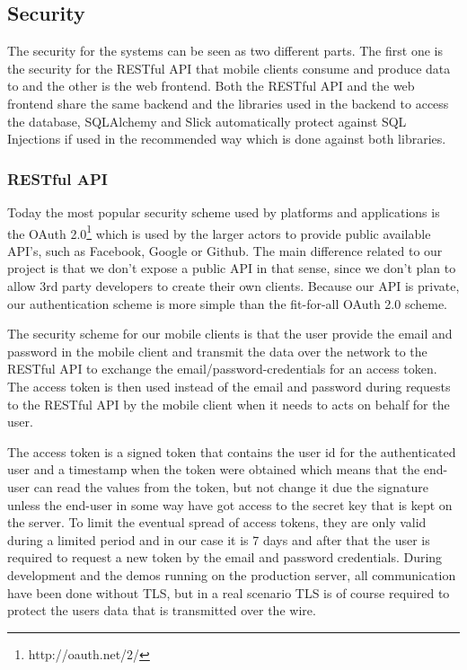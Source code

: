\subsection{Security}
The security for the systems can be seen as two different parts. The first one is the security for the RESTful API that mobile clients consume and produce data to and the other is the web frontend. Both the RESTful API and the web frontend share the same backend and the libraries used in the backend to access the database, SQLAlchemy and Slick automatically protect against SQL Injections if used in the recommended way which is done against both libraries.

\subsubsection{RESTful API}
Today the most popular security scheme used by platforms and applications is the OAuth 2.0\footnote{http://oauth.net/2/} which is used by the larger actors to provide public available API's, such as Facebook, Google or Github. The main difference related to our project is that we don't expose a public API in that sense, since we don't plan to allow 3rd party developers to create their own clients. Because our API is private, our authentication scheme is more simple than the fit-for-all OAuth 2.0 scheme. 

The security scheme for our mobile clients is that the user provide the email and password in the mobile client and transmit the data over the network to the RESTful API to exchange the email/password-credentials for an access token. The access token is then used instead of the email and password during requests to the RESTful API by the mobile client when it needs to acts on behalf for the user. 

The access token is a signed token that contains the user id for the authenticated user and a timestamp when the token were obtained which means that the end-user can read the values from the token, but not change it due the signature unless the end-user in some way have got access to the secret key that is kept on the server. To limit the eventual spread of access tokens, they are only valid during a limited period and in our case it is 7 days and after that the user is required to request a new token by the email and password credentials. During development and the demos running on the production server, all communication have been done without TLS, but in a real scenario TLS is of course required to protect the users data that is transmitted over the wire.

